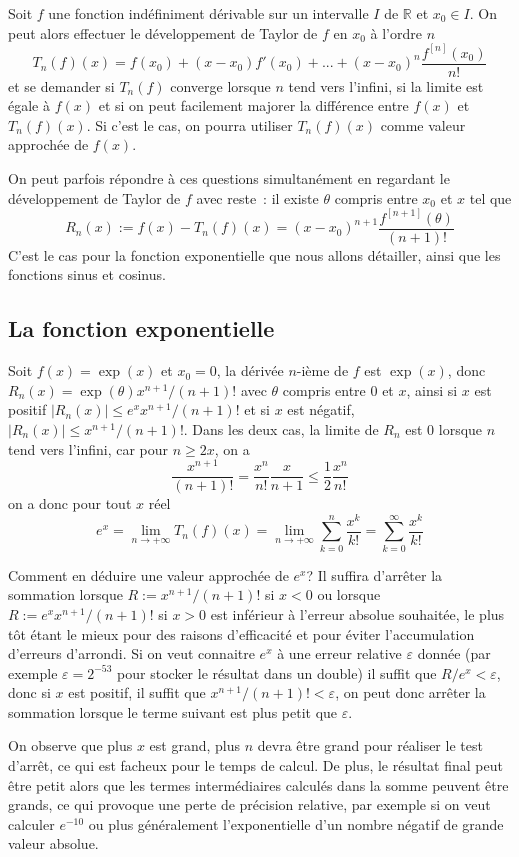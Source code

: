 \documentclass[a4paper,11pt]{article}
\begin{document}
\begin{giacjshere}
Soit $f$ une fonction indéfiniment dérivable sur un intervalle $I$ de $\mathbb{R}$
et $x_0 \in I$. On peut alors effectuer le développement de Taylor de $f$
en $x_0$ à l'ordre $n$
\[ T_n(f)(x)= f(x_0) + (x-x_0) f'(x_0) + ... + 
(x-x_0)^n \frac{f^{[n]}(x_0)}{n!} \]
et se demander si $T_n(f)$ converge lorsque $n$ tend vers
l'infini, si la limite est égale à $f(x)$ et si on peut facilement
majorer la différence entre $f(x)$ et $T_n(f)(x)$. Si c'est le
cas, on pourra utiliser $T_n(f)(x)$ comme valeur approchée de $f(x)$.

On peut parfois répondre à ces questions simultanément en regardant le
développement de Taylor de $f$ avec reste~: il existe $\theta$ compris
entre $x_0$ et $x$ tel que
\[ R_n(x) := f(x)- T_n(f)(x) = (x-x_0)^{n+1}\frac{f^{[n+1]}(\theta)}{(n+1)!} \]
C'est le cas pour la fonction exponentielle que nous allons
détailler, ainsi que les fonctions sinus et cosinus.

\subsection{La fonction exponentielle}
Soit $f(x)=\exp(x)$ et $x_0=0$, la dérivée $n$-ième de $f$ 
est $\exp(x)$, donc $R_n(x)=\exp(\theta)x^{n+1}/(n+1)!$ avec $\theta$
compris entre 0 et $x$, ainsi si $x$ est positif 
$|R_n(x)| \leq e^x x^{n+1}/(n+1)!$ et si $x$ est négatif,
$|R_n(x)| \leq x^{n+1}/(n+1)!$. Dans les deux cas, la limite de $R_n$
est 0 lorsque $n$ tend vers l'infini, car pour $n \geq 2x$, on a
\[ \frac{x^{n+1}}{(n+1)!} = \frac{x^n}{n!} \frac{x}{n+1}\leq 
\frac{1}{2}\frac{x^n}{n!}\]
on a donc pour tout $x$ réel
\[ e^x = \lim_{n \rightarrow +\infty} T_n(f)(x)
= \lim_{n \rightarrow +\infty} \sum_{k=0}^n \frac{x^k}{k!}
= \sum_{k=0}^\infty \frac{x^k}{k!} \]

Comment en déduire une valeur approchée de $e^x$? Il suffira d'arr\^eter
la sommation lorsque $R:=x^{n+1}/(n+1)!$ si $x<0$ ou lorsque
$R:=e^x x^{n+1}/(n+1)!$ si $x>0$ est inférieur à 
l'erreur absolue souhaitée, le plus tôt étant le mieux pour des
raisons d'efficacité et pour éviter l'accumulation d'erreurs
d'arrondi. 
Si on veut connaitre $e^x$ à une erreur relative $\varepsilon$ donnée
(par exemple $\varepsilon=2^{-53}$ pour stocker le résultat dans un double)
il suffit que $R/e^x < \varepsilon$, donc si $x$ est positif, il suffit
que $x^{n+1}/(n+1)!<\varepsilon$, on peut donc arrêter la sommation
lorsque le terme suivant est plus petit que $\varepsilon$.

On observe que plus $x$ est grand, plus $n$ devra
être grand pour réaliser le test d'arrêt, ce qui est facheux
pour le temps de calcul.
De plus, le résultat final peut être petit alors que les termes
intermédiaires calculés dans la somme peuvent être grands, ce qui
provoque une perte de précision relative, par exemple si on
veut calculer $e^{-10}$ ou plus généralement l'exponentielle
d'un nombre négatif de grande valeur absolue.


\end{giacjshere}
\end{document}
